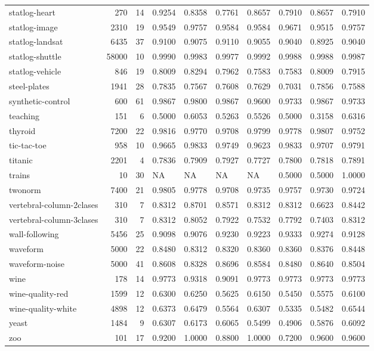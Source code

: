 \documentclass{article}
\begin{document}
\begin{table}
\footnotesize
\begin{tabular}{lrrlllllll}
statlog-heart & 270 & 14 & 0.9254 & 0.8358 & 0.7761 & 0.8657 & 0.7910 & 0.8657 & 0.7910\tabularnewline
statlog-image & 2310 & 19 & 0.9549 & 0.9757 & 0.9584 & 0.9584 & 0.9671 & 0.9515 & 0.9757\tabularnewline
statlog-landsat & 6435 & 37 & 0.9100 & 0.9075 & 0.9110 & 0.9055 & 0.9040 & 0.8925 & 0.9040\tabularnewline
statlog-shuttle & 58000 & 10 & 0.9990 & 0.9983 & 0.9977 & 0.9992 & 0.9988 & 0.9988 & 0.9987\tabularnewline
statlog-vehicle & 846 & 19 & 0.8009 & 0.8294 & 0.7962 & 0.7583 & 0.7583 & 0.8009 & 0.7915\tabularnewline
steel-plates & 1941 & 28 & 0.7835 & 0.7567 & 0.7608 & 0.7629 & 0.7031 & 0.7856 & 0.7588\tabularnewline
synthetic-control & 600 & 61 & 0.9867 & 0.9800 & 0.9867 & 0.9600 & 0.9733 & 0.9867 & 0.9733\tabularnewline
teaching & 151 & 6 & 0.5000 & 0.6053 & 0.5263 & 0.5526 & 0.5000 & 0.3158 & 0.6316\tabularnewline
thyroid & 7200 & 22 & 0.9816 & 0.9770 & 0.9708 & 0.9799 & 0.9778 & 0.9807 & 0.9752\tabularnewline
tic-tac-toe & 958 & 10 & 0.9665 & 0.9833 & 0.9749 & 0.9623 & 0.9833 & 0.9707 & 0.9791\tabularnewline
titanic & 2201 & 4 & 0.7836 & 0.7909 & 0.7927 & 0.7727 & 0.7800 & 0.7818 & 0.7891\tabularnewline
trains & 10 & 30 & NA & NA & NA & NA & 0.5000 & 0.5000 & 1.0000\tabularnewline
twonorm & 7400 & 21 & 0.9805 & 0.9778 & 0.9708 & 0.9735 & 0.9757 & 0.9730 & 0.9724\tabularnewline
vertebral-column-2clases & 310 & 7 & 0.8312 & 0.8701 & 0.8571 & 0.8312 & 0.8312 & 0.6623 & 0.8442\tabularnewline
vertebral-column-3clases & 310 & 7 & 0.8312 & 0.8052 & 0.7922 & 0.7532 & 0.7792 & 0.7403 & 0.8312\tabularnewline
wall-following & 5456 & 25 & 0.9098 & 0.9076 & 0.9230 & 0.9223 & 0.9333 & 0.9274 & 0.9128\tabularnewline
waveform & 5000 & 22 & 0.8480 & 0.8312 & 0.8320 & 0.8360 & 0.8360 & 0.8376 & 0.8448\tabularnewline
waveform-noise & 5000 & 41 & 0.8608 & 0.8328 & 0.8696 & 0.8584 & 0.8480 & 0.8640 & 0.8504\tabularnewline
wine & 178 & 14 & 0.9773 & 0.9318 & 0.9091 & 0.9773 & 0.9773 & 0.9773 & 0.9773\tabularnewline
wine-quality-red & 1599 & 12 & 0.6300 & 0.6250 & 0.5625 & 0.6150 & 0.5450 & 0.5575 & 0.6100\tabularnewline
wine-quality-white & 4898 & 12 & 0.6373 & 0.6479 & 0.5564 & 0.6307 & 0.5335 & 0.5482 & 0.6544\tabularnewline
yeast & 1484 & 9 & 0.6307 & 0.6173 & 0.6065 & 0.5499 & 0.4906 & 0.5876 & 0.6092\tabularnewline
zoo & 101 & 17 & 0.9200 & 1.0000 & 0.8800 & 1.0000 & 0.7200 & 0.9600 & 0.9600\tabularnewline
\bottomrule
\end{tabular}
\end{table}
\end{document}
